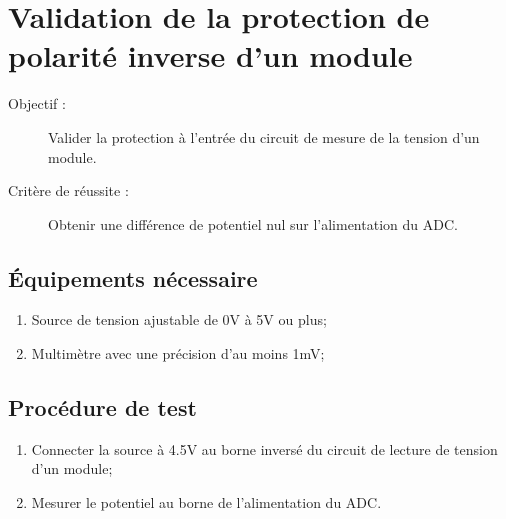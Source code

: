 
\section{Validation de la protection de polarité inverse d'un module}

	\begin{description}
		\item[Objectif :] Valider la protection à l'entrée du circuit de mesure de la tension d'un module.
		\item[Critère de réussite :] Obtenir une différence de potentiel nul sur l'alimentation du ADC.
	\end{description}
	
	\subsection*{Équipements nécessaire}
	\begin{enumerate}
		\item Source de tension ajustable de 0V à 5V ou plus;
		\item Multimètre avec une précision d'au moins 1mV;
	\end{enumerate}	
	
	\subsection*{Procédure de test}
	\begin{enumerate}
		\item Connecter la source à 4.5V au borne inversé du circuit de lecture de tension d'un module;
		\item Mesurer le potentiel au borne de l'alimentation du ADC.
	\end{enumerate}